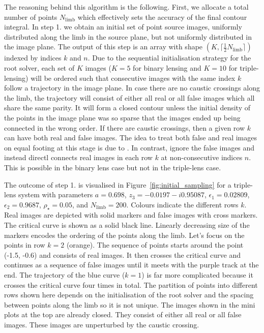 \documentclass[12pt,dvipsnames]{report}
\begin{document}
The reasoning behind this algorithm is the following. First, we allocate a total number
of points $N_\mathrm{limb}$ which effectively sets the accuracy of the final contour integral.
In step 1. we obtain an initial set of point source images, uniformly distributed along the limb 
in the source plane, but not uniformly distributed in the image plane. The output of this step 
is an array with shape $(K, \lceil\frac{1}{2}N_\mathrm{limb}\rceil)$ indexed by indices $k$ and $n$.
Due to the sequential initialisation strategy for the root solver, each set of $K$ images 
($K=5$ for binary lensing and $K=10$ for triple-lensing) will be ordered such that 
consecutive images with the same index $k$ follow a trajectory in the image plane. In case 
there are no caustic crossings along the limb, the trajectory will consist of either all 
real or all false images which all share the same parity.
It will
form a closed contour unless the initial density of the points in the image plane was so sparse
that the images ended up being connected in the wrong order. 
If there are caustic crossings,
then a given row $k$ can have both real and false images.
The idea to treat both false and real images on equal footing at this stage is due to 
\citet{2021MNRAS.503.6143K}. In contrast, \citet{2010MNRAS.408.2188B} ignore the false images and 
instead directl connects real images in each row $k$ at non-consecutive indices $n$.
This is possible in the binary lens case but not in the triple-lens case. 

The outcome of step 1. is visualised in Figure~\ref{fig:initial_sampling} for a triple-lens 
system with parameters $a=0.698$, $z_3=-0.0197 - i0.95087$, $\epsilon_1=0.02809$, 
$\epsilon_2=0.9687$, $\rho_\star=0.05$, and $N_\mathrm{limb}=200$. 
Colours indicate the different rows $k$. Real images are depicted with solid markers and 
false images with cross markers. The critical curve is shown as a solid black line. Linearly 
decreasing size of the markers encodes the ordering of the points along the limb.
Let's focus on the points in row $k=2$ (orange). The sequence of points starts around the 
point (-1.5, -0.6) and consists  of real images. It then crosses the critical curve and 
continues as a sequence of false images until it meets with the purple track at the end. 
The trajectory of the blue curve ($k=1$) is far more complicated because 
it crosses the critical curve four times in total. The partition of points into different rows
shown here depends on the initialisation of the root solver and the spacing between points along 
the limb so it is not unique. The images shown in the mini plots at the top are already closed.
They consist of either all real or all false images. These images are unperturbed by the caustic crossing.
\end{document}
